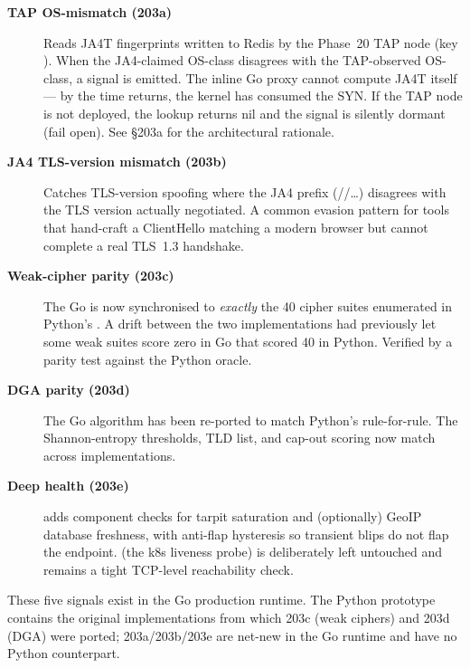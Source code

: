 \begin{description}
  \item[\textbf{TAP OS-mismatch (203a)}] Reads JA4T fingerprints written to Redis
    by the Phase~20 TAP node (key ). When the JA4-claimed
    OS-class disagrees with the TAP-observed OS-class, a signal is emitted.
    The inline Go proxy cannot compute JA4T itself --- by the time 
    returns, the kernel has consumed the SYN. If the TAP node is not deployed,
    the lookup returns nil and the signal is silently dormant (fail open).
    See  \S203a for the architectural rationale.

  \item[\textbf{JA4 TLS-version mismatch (203b)}] Catches TLS-version spoofing
    where the JA4 prefix (//\dots) disagrees with the TLS
    version actually negotiated. A common evasion pattern for tools that
    hand-craft a ClientHello matching a modern browser but cannot complete a
    real TLS~1.3 handshake.

  \item[\textbf{Weak-cipher parity (203c)}] The Go  is now
    synchronised to \emph{exactly} the 40 cipher suites enumerated in Python's
    . A drift between the two implementations had previously
    let some weak suites score zero in Go that scored 40 in Python. Verified by
    a parity test against the Python oracle.

  \item[\textbf{DGA parity (203d)}] The Go  algorithm has
    been re-ported to match Python's  rule-for-rule. The
    Shannon-entropy thresholds, TLD list, and cap-out scoring now match across
    implementations.

  \item[\textbf{Deep health (203e)}]  adds component checks
    for tarpit saturation and (optionally) GeoIP database freshness, with
    anti-flap hysteresis so transient blips do not flap the endpoint.
     (the k8s liveness probe) is deliberately left untouched and
    remains a tight TCP-level reachability check.
\end{description}

\begin{notebox}
These five signals exist in the Go production runtime. The Python prototype
contains the original implementations from which 203c (weak ciphers) and 203d
(DGA) were ported; 203a/203b/203e are net-new in the Go runtime and have no
Python counterpart.
\end{notebox}
